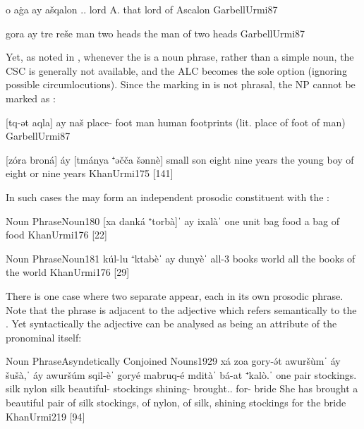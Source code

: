  



{o aġa ay ašqalon}
{\dem.\far.\sg{} lord \lnk{} A.}
{that lord of Ascalon}
{GarbellUrmi}{87}

{gora ay tre reše}
{man \lnk{} two heads}
{the man of two heads}
{GarbellUrmi}{87}

Yet, as noted in , whenever the \prim is a noun phrase, rather than a simple noun, the CSC is generally not available, and the ALC becomes the sole option (ignoring possible circumlocutions). Since the \cst* marking in \JUrm is not phrasal, the \prim NP cannot be marked as \cst*: 

{[tq-ət aqla] ay naš}
{place-\cst{} foot \lnk{} man}
{human footprints (lit. place of foot of man)}
{GarbellUrmi}{87}

{[zóra broná] áy [tmánya ⁺əčča šənnè]}
{small son \lnk{} eight nine years}
{the young boy of eight or nine years}
{KhanUrmi}{175 {[141]}}

In such cases the \lnk* may form an independent prosodic constituent with the \secn:

\acex
{Noun Phrase}{Noun}{180}
{[xa\cb{} danká ⁺torbà]ˈ ay\cb{} ixalàˈ}
{one\cb{} unit bag \lnk\cb{} food}
{a bag of food}
{KhanUrmi}{176 {[22]}}

\acex
{Noun Phrase}{Noun}{181}
{kúl-lu ⁺ktabèˈ ay\cb{} dunyèˈ}
{all-3\pl{} books \lnk\cb{} world}
{all the books of the world}
{KhanUrmi}{176 {[29]}}

\newpage 
There is one case where two separate \secns appear, each in its own prosodic phrase. Note that the \lnk* phrase  is adjacent to the adjective  which refers semantically to the \prim {}. Yet syntactically the adjective can be analysed as being an attribute of the pronominal \lnk* itself:

\acex
{Noun Phrase}{Asyndetically Conjoined Nouns}{1929}
{xá\cb{} zoa gory-ə́t awuršùmˈ áy šušà,ˈ áy awuršúm sqil-èˈ goryé mabruq-é mditàˈ bá-at ⁺kalò.ˈ}
{one\cb{} pair stockings.\cst{} silk \lnk{} nylon \lnk{} silk beautiful-\pl{} stockings shining-\pl{} brought.\resl.\fem{} for-\cst{} bride}
{She has brought a beautiful pair of silk stockings, of nylon, of silk, shining stockings for the bride}
{KhanUrmi}{219 {[94]}}

